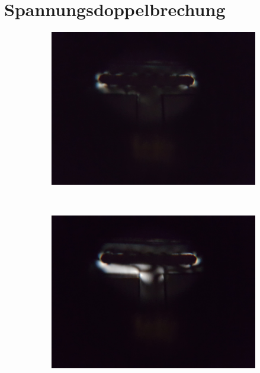 \chapter{Spannungsdoppelbrechung}

\begin{figure}[tb]
	\begin{subfigure}{.3\textwidth}
		\centering
		\includegraphics[height=.8\linewidth]{./img/tense1.jpg}
		\label{subfig:tensea}
	\end{subfigure}
	$\quad$
	\begin{subfigure}{.3\textwidth}
		\centering
		\includegraphics[height=.8\linewidth]{./img/tense3.jpg}

\end{subfigure}
\end{figure}
